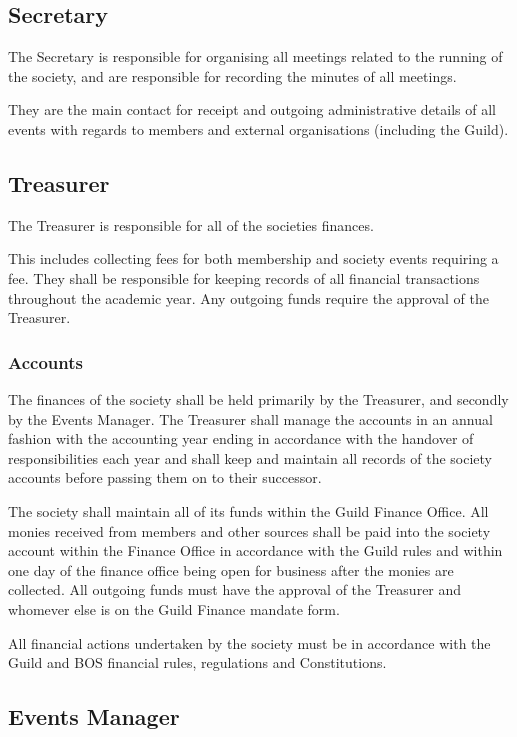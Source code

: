 \documentclass{report}
\begin{document}
	\subsection{Secretary}
	
	The Secretary is responsible for organising all meetings related to the running of the society, and are responsible for recording the minutes of all meetings.
	
	They are the main contact for receipt and outgoing administrative details of all events with regards to members and external organisations (including the Guild).
	
	\subsection{Treasurer}
	
	The Treasurer is responsible for all of the societies finances.
	
	This includes collecting fees for both membership and society events requiring a fee. They shall be responsible for keeping records of all financial transactions throughout the academic year. Any outgoing funds require the approval of the Treasurer.
	
		\subsubsection{Accounts}
		
		The finances of the society shall be held primarily by the Treasurer, and secondly by the Events Manager. The Treasurer shall manage the accounts in an annual fashion with the accounting year ending in accordance with the handover of responsibilities each year and shall keep and maintain all records of the society accounts before passing them on to their successor.
		
		The society shall maintain all of its funds within the Guild Finance Office. All monies received from members and other sources shall be paid into the society account within the Finance Office in accordance with the Guild rules and within one day of the finance office being open for business after the monies are collected. All outgoing funds must have the approval of the Treasurer and whomever else is on the Guild Finance mandate form.
		
		All financial actions undertaken by the society must be in accordance with the Guild and BOS financial rules, regulations and Constitutions.
	
	\subsection{Events Manager}
	
\end{document}
